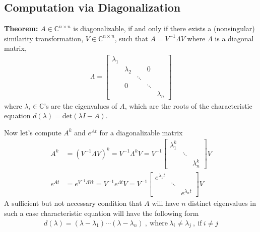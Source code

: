 \documentclass[twoside]{article}
\begin{document}
\subsection{Computation via Diagonalization}

\textbf{Theorem:} $A \in \mathbb{C}^{n \times n}$ is diagonalizable, if and only if there exists a (nonsingular) similarity transformation, 
$V \in \mathbb{C}^{n \times n}$, such that $A = V^{-1} \Lambda V$ where $\Lambda$ is a diagonal matrix, 
%
\begin{align*}
	\Lambda = \left[ \begin{array}{ccccc} \lambda_1 &  & & &  \\  & \lambda_2  &  & 0 &  \\ &  & \ddots & \\ & 0 & & \ddots & \\ & &  & &  \lambda_n \end{array} \right]
\end{align*}
%
where $\lambda_i \in \mathbb{C}$'s are the eigenvalues of $A$, which are the roots of the characteristic equation $d(\lambda) = \mathrm{det}(\lambda I - A)$.

Now let's compute $A^k$ and $e^{At}$ for a diagonalizable matrix 
%
\begin{align*}
A^k &= \left(V^{-1} \Lambda V \right)^k  = V^{-1} \Lambda^k V = V^{-1} \left[ \begin{array}{ccc} \lambda_1^k &  &   \\   &  \ddots & \\ & & \lambda_n^k \end{array} \right] V
\\
e^{A t} &= e^{V^{-1} \Lambda V t}  = V^{-1} e^{ \Lambda t} V = V^{-1} \left[ \begin{array}{ccc} e^{\lambda_1 t} &  &   \\   &  \ddots & \\ & & e^{\lambda_n t} \end{array} \right] V  
\end{align*}
%
A sufficient but not necessary condition that $A$ will have $n$ distinct eigenvalues in such a case characteristic equation will have the following form
%
\begin{align*}
d(\lambda) = (\lambda - \lambda_1) \cdots (\lambda - \lambda_n) \ , \ \mathrm{where} \ \lambda_i \neq \lambda_j \ , \ \mathrm{if} \ i \neq j 
\end{align*}


\end{document}
